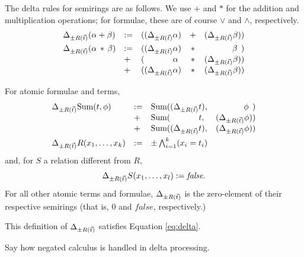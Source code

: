 The delta rules for semirings are as follows. We use $+$ and $*$ for the
addition and multiplication operations; for formulae, these are of course
$\lor$ and $\land$, respectively.
\[\begin{array}{lllcr}
\Delta_{\pm R(\vec{t})} (\alpha + \beta) &:=& ((\Delta_{\pm R(\vec{t})} \alpha)    &+& (\Delta_{\pm R(\vec{t})} \beta))
\\[1ex]
\Delta_{\pm R(\vec{t})} (\alpha \,*\, \beta)
   &:=& ((\Delta_{\pm R(\vec{t})} \alpha)               &*& \beta\;\,) \\
   &+ & (\quad\quad\quad\;\, \alpha &*& (\Delta_{\pm R(\vec{t})} \beta)) \\
   &+ & ((\Delta_{\pm R(\vec{t})} \alpha)               &*& (\Delta_{\pm R(\vec{t})} \beta))
\end{array}\]

For atomic formulae and terms,
\[\begin{array}{lllr}
\Delta_{\pm R(\vec{t})} \mbox{Sum}(t, \phi)
   &:=& \mbox{Sum}((\Delta_{\pm R(\vec{t})} t), & \phi\;\,) \\
   &+ & \mbox{Sum}(\quad\quad\quad\; \,t,  & (\Delta_{\pm R(\vec{t})} \phi)) \\
   &+ & \mbox{Sum}((\Delta_{\pm R(\vec{t})} t), & (\Delta_{\pm R(\vec{t})} \phi))
\\[1ex]
\Delta_{\pm R(\vec{t})} R(x_1, \dots, x_k) &:=& \pm \bigwedge_{i=1}^k (x_i = t_i)
\end{array}\]
and, for $S$ a relation different from $R$,
\[
\Delta_{\pm R(\vec{t})} S(x_1, \dots, x_l) := \textit{false}.
\]
For all other atomic terms and formulae, $\Delta_{\pm R(\vec{t})}$ is the zero-element
of their respective semirings (that is, $0$ and $\textit{false}$,
respectively.)


\begin{proposition}
\label{prop:delta-correct}
This definition of $\Delta_{\pm R(\vec{t})}$ satisfies Equation \ref{eq:delta}.
\end{proposition}


\def\duv{\Delta_{\pm R(u,v)}}


\begin{todo}
Say how negated calculus is handled in delta processing.
\end{todo}


\def\dc{\Delta_{\pm C(c,n)}}


